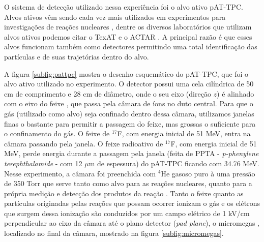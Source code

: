 \documentclass[a4paper,12pt,oneside]{book}
\begin{document}
\par O sistema de detecção utilizado nessa experiência foi o alvo ativo pAT-TPC. Alvos ativos vêm sendo cada vez mais utilizados em experimentos para investigações de reações nucleares \cite{FORTINO2022166497}, dentre os diversos laboratórios que utilizam alvos ativos podemos citar o TexAT \cite{KOSHCHIY2020163398} e o ACTAR \cite{MAUSS2019498}. A principal razão é que esses alvos funcionam também como detectores permitindo uma total identificação das partículas e de suas trajetórias dentro do alvo.

\par A figura \ref{subfig:pattpc} mostra o desenho esquemático do pAT-TPC, que foi o alvo ativo utilizado no experimento. O detector possui uma cela cilíndrica de 50 cm de comprimento e 28 cm de diâmetro, onde o seu eixo (direção $z$) é alinhado com o eixo do feixe \cite{pattpc}, que passa pela câmara de íons no duto central. Para que o gás (utilizado como alvo) seja confinado dentro dessa câmara, utilizamos janelas finas o bastante para permitir a passagem do feixe, mas grossas o suficiente para o confinamento do gás. O feixe de $^{17}$F, com energia inicial de 51 MeV, entra na câmara passando pela janela. O feixe radioativo de $^{17}$F, com energia inicial de 51 MeV, perde energia durante a passagem pela janela (feita de PPTA - \textit{p-phenylene terephthalamide} - com 12 $\mu$m de espessura) do pAT-TPC ficando com 34.76 MeV. Nesse experimento, a câmara foi preenchida com $^4$He gasoso puro à uma pressão de 350 Torr que serve tanto como alvo para as reações nucleares, quanto para a própria medição e detecção dos produtos da reação \cite{pattpc, pattpc2}. Tanto o feixe quanto as partículas originadas pelas reações que possam ocorrer ionizam o gás e os elétrons que surgem dessa ionização são conduzidos por um campo elétrico de 1 kV/cm perpendicular ao eixo da câmara até o plano detector (\textit{pad plane}), o micromegas \cite{micromegas}, localizado no final da câmara, mostrado na figura \ref{subfig:micromegas}.


\end{document}
